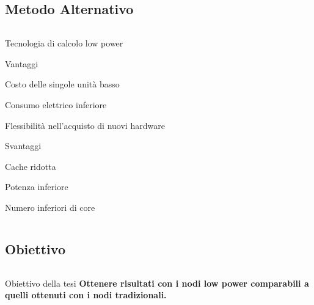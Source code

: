 \documentclass{beamer}
\begin{document}
\subsection{Metodo Alternativo}
\begin{frame}
\begin{columns}
\begin{column}{0.8\linewidth}		
\begin{block}{Tecnologia di calcolo low power}
\begin{itemize}
\begin{block}{Vantaggi}
\small
\item Costo delle singole unità basso
\item Consumo elettrico inferiore
\item Flessibilità nell'acquisto di nuovi hardware
\end{block}
\begin{block}{Svantaggi}
\small
\item Cache ridotta
\item Potenza inferiore
\item Numero inferiori di core
\end{block}
\end{itemize}
\end{block}
\end{column}
\end{columns}
\end{frame}

\subsection{Obiettivo}
\begin{frame}
\begin{columns}
\begin{column}{0.8\linewidth}		
\begin{block}{Obiettivo della tesi}
\small
\textbf{Ottenere risultati con i nodi low power
comparabili a quelli ottenuti con i nodi tradizionali.}
\end{block}
\end{column}
\end{columns}
\end{frame}
\end{document}
